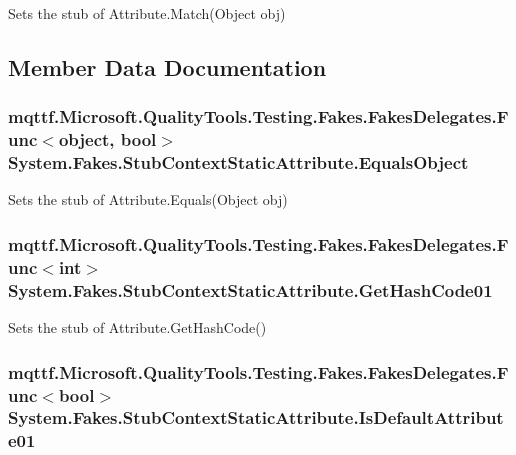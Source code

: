Sets the stub of Attribute.\-Match(\-Object obj)



\subsection{Member Data Documentation}
\hypertarget{class_system_1_1_fakes_1_1_stub_context_static_attribute_a75f86252dfda8f4672ab3066d3e9b47c}{
\subsubsection[{Equals\-Object}]{\setlength{\rightskip}{0pt plus 5cm}mqttf.\-Microsoft.\-Quality\-Tools.\-Testing.\-Fakes.\-Fakes\-Delegates.\-Func$<$object, bool$>$ System.\-Fakes.\-Stub\-Context\-Static\-Attribute.\-Equals\-Object}}\label{class_system_1_1_fakes_1_1_stub_context_static_attribute_a75f86252dfda8f4672ab3066d3e9b47c}


Sets the stub of Attribute.\-Equals(\-Object obj)

\hypertarget{class_system_1_1_fakes_1_1_stub_context_static_attribute_abcc1e2cbeee731083d8376eb9613ff20}{
\subsubsection[{Get\-Hash\-Code01}]{\setlength{\rightskip}{0pt plus 5cm}mqttf.\-Microsoft.\-Quality\-Tools.\-Testing.\-Fakes.\-Fakes\-Delegates.\-Func$<$int$>$ System.\-Fakes.\-Stub\-Context\-Static\-Attribute.\-Get\-Hash\-Code01}}\label{class_system_1_1_fakes_1_1_stub_context_static_attribute_abcc1e2cbeee731083d8376eb9613ff20}


Sets the stub of Attribute.\-Get\-Hash\-Code()

\hypertarget{class_system_1_1_fakes_1_1_stub_context_static_attribute_ac5ede77ddf9f813ae98ce92df9502023}{
\subsubsection[{Is\-Default\-Attribute01}]{\setlength{\rightskip}{0pt plus 5cm}mqttf.\-Microsoft.\-Quality\-Tools.\-Testing.\-Fakes.\-Fakes\-Delegates.\-Func$<$bool$>$ System.\-Fakes.\-Stub\-Context\-Static\-Attribute.\-Is\-Default\-Attribute01}}\label{class_system_1_1_fakes_1_1_stub_context_static_attribute_ac5ede77ddf9f813ae98ce92df9502023}


